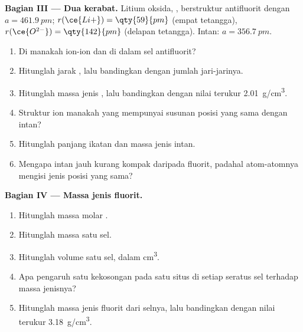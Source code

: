 \begin{problem}
\medskip
\noindent\textbf{Bagian III --- Dua kerabat.}
Litium oksida, , berstruktur antifluorit dengan
$a = \qty{461.9}{pm}$; $r(\ce{Li+}) = \qty{59}{pm}$ (empat tetangga),
$r(\ce{O^{2-}}) =
\qty{142}{pm}$ (delapan tetangga). Intan:
$a = \qty{356.7}{pm}$.
\begin{enumerate}[resume]
  \item Di manakah ion-ion  dan  di dalam sel
        antifluorit?
  \item Hitunglah jarak , lalu bandingkan dengan jumlah
        jari-jarinya.
  \item Hitunglah massa jenis , lalu bandingkan dengan nilai
        terukur \qty{2.01}{g/cm^3}.
  \item Struktur ion manakah yang mempunyai susunan posisi yang sama
        dengan intan?
  \item Hitunglah panjang ikatan  dan massa jenis intan.
  \item Mengapa intan jauh kurang kompak daripada fluorit, padahal
        atom-atomnya mengisi jenis posisi yang sama?
\end{enumerate}

\medskip
\noindent\textbf{Bagian IV --- Massa jenis fluorit.}
\begin{enumerate}[resume]
  \item Hitunglah massa molar .
  \item Hitunglah massa satu sel.
  \item Hitunglah volume satu sel, dalam \unit{cm^3}.
  \item Apa pengaruh satu kekosongan pada satu situs  di setiap
        seratus sel terhadap massa jenisnya?
  \item Hitunglah massa jenis fluorit dari selnya, lalu bandingkan dengan
        nilai terukur \qty{3.18}{g/cm^3}.
\end{enumerate}
\end{problem}
